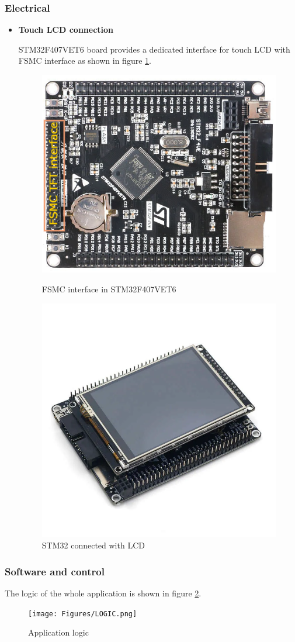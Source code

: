 \subsubsection{Electrical}
\begin{itemize}
    \item \textbf{Touch LCD connection}
    \par
    STM32F407VET6 board provides a dedicated interface for touch LCD with FSMC interface as shown in figure \ref{fig:fsmc_interface}.
    \begin{figure}[H]
        \centering
        \includegraphics[width=.45\textwidth, height=.325\textheight]{Figures/STM32F407VET6.png}
        \caption[Load cells circuit]{FSMC interface in STM32F407VET6 \cite{mcu_lcd}}
        \includegraphics[width=.45\textwidth, height=.325\textheight]{Figures/stm32f407vet6_with_lcd.png}
        \caption[STM32 connected with LCD]{STM32 connected with LCD \cite{mcu_lcd}}
        \label{fig:fsmc_interface}
    \end{figure}
\end{itemize}

\subsubsection{Software and control}
The logic of the whole application is shown in figure \ref{fig:application_logic}.

\begin{figure}[H]
    \centering
    \texttt{[image: Figures/LOGIC.png]}
    \caption{Application logic}
    \label{fig:application_logic}
\end{figure}

